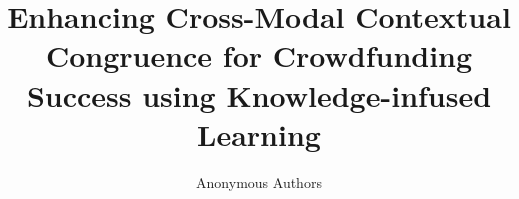 \documentclass[sigconf]{acmart}
\begin{document}
\title{
Enhancing Cross-Modal Contextual Congruence for Crowdfunding Success using Knowledge-infused Learning %
}






\author{Anonymous Authors}

\renewcommand{\shortauthors}{author name and author name, et al.}
\end{document}
